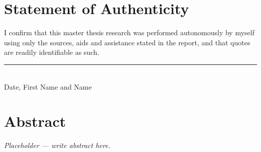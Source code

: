 \documentclass[12pt, a4paper]{report}
\begin{document}

\chapter*{Statement of Authenticity}
\thispagestyle{plain}

I confirm that this master thesis research was performed autonomously by myself using only the
sources, aids and assistance stated in the report, and that quotes are readily identifiable as such.

\vspace{3cm}

\noindent\rule{8cm}{0.4pt}\\
Date, First Name and Name

\clearpage

\chapter*{Abstract}
\thispagestyle{plain}

\textit{Placeholder — write abstract here.}

\clearpage


\tableofcontents
\clearpage







\clearpage
{}
\printbibliography[title={References}]
\end{document}
